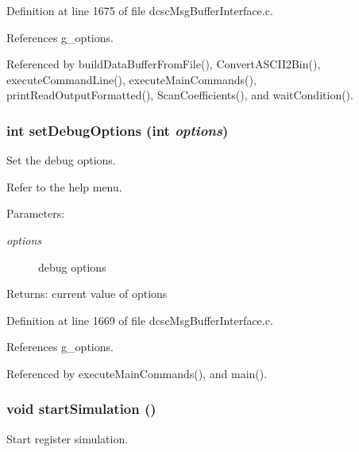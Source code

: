 Definition at line 1675 of file dcsc\-Msg\-Buffer\-Interface.c.

References g\_\-options.

Referenced by build\-Data\-Buffer\-From\-File(), Convert\-ASCII2Bin(), execute\-Command\-Line(), execute\-Main\-Commands(), print\-Read\-Output\-Formatted(), Scan\-Coefficients(), and wait\-Condition().\hypertarget{group__dcsc__msg__buffer__access_gc07186b103fbe4c39531665c95e22c7e}{
\subsubsection[setDebugOptions]{\setlength{\rightskip}{0pt plus 5cm}int set\-Debug\-Options (int {\em options})}}
\label{group__dcsc__msg__buffer__access_gc07186b103fbe4c39531665c95e22c7e}


Set the debug options. 

Refer to the help menu. \begin{Desc}
\item[Parameters:]
\begin{description}
\item[{\em options}]debug options \end{description}
\end{Desc}
\begin{Desc}
\item[Returns:]current value of options \end{Desc}


Definition at line 1669 of file dcsc\-Msg\-Buffer\-Interface.c.

References g\_\-options.

Referenced by execute\-Main\-Commands(), and main().\hypertarget{group__dcsc__msg__buffer__access_g0adb3aacb8d7ad32ceabe66a9dcbb401}{
\subsubsection[startSimulation]{\setlength{\rightskip}{0pt plus 5cm}void start\-Simulation ()}}
\label{group__dcsc__msg__buffer__access_g0adb3aacb8d7ad32ceabe66a9dcbb401}


Start register simulation. 

